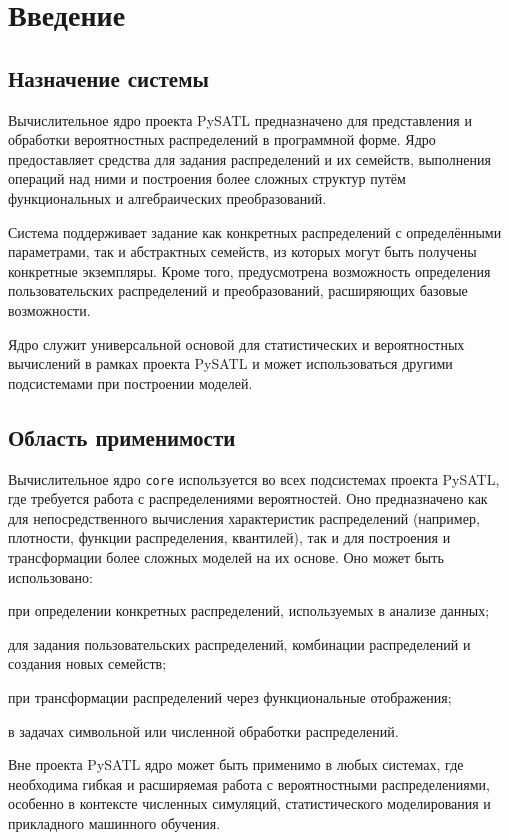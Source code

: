 \chapter{Введение}
\section{Назначение системы}
Вычислительное ядро проекта PySATL предназначено для представления и обработки вероятностных распределений в программной форме. Ядро предоставляет средства для задания распределений и их семейств, выполнения операций над ними и построения более сложных структур путём функциональных и алгебраических преобразований.

Система поддерживает задание как конкретных распределений с определёнными параметрами, так и абстрактных семейств, из которых могут быть получены конкретные экземпляры. Кроме того, предусмотрена возможность определения пользовательских распределений и преобразований, расширяющих базовые возможности.

Ядро служит универсальной основой для статистических и вероятностных вычислений в рамках проекта PySATL и может использоваться другими подсистемами при построении моделей.

\section{Область применимости}
Вычислительное ядро \texttt{core} используется во всех подсистемах проекта PySATL, где требуется работа с распределениями вероятностей. Оно предназначено как для непосредственного вычисления характеристик распределений (например, плотности, функции распределения, квантилей), так и для построения и трансформации более сложных моделей на их основе.  Оно может быть использовано:
\begin{itemizecmp}
    \item при определении конкретных распределений, используемых в анализе данных;
    \item для задания пользовательских распределений, комбинации распределений и создания новых семейств;
    \item при трансформации распределений через функциональные отображения;
    \item в задачах символьной или численной обработки распределений.
\end{itemizecmp}

Вне проекта PySATL ядро может быть применимо в любых системах, где необходима гибкая и расширяемая работа с вероятностными распределениями, особенно в контексте численных симуляций, статистического моделирования и прикладного машинного обучения.

